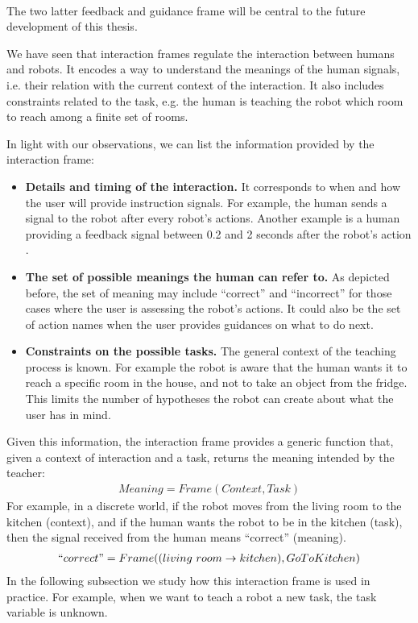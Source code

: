 \paragraph{} The two latter feedback and guidance frame will be central to the future development of this thesis. 

\transition

We have seen that interaction frames regulate the interaction between humans and robots. It encodes a way to understand the meanings of the human signals, i.e. their relation with the current context of the interaction. It also includes constraints related to the task, e.g. the human is teaching the robot which room to reach among a finite set of rooms.

In light with our observations, we can list the information provided by the interaction frame:

\begin{itemize}

\item \textbf{Details and timing of the interaction.} It corresponds to when and how the user will provide instruction signals. For example, the human sends a signal to the robot after every robot's actions. Another example is a human providing a feedback signal between 0.2 and 2 seconds after the robot's action \cite{knox2009interactively}.

\item \textbf{The set of possible meanings the human can refer to.} As depicted before, the set of meaning may include ``correct'' and ``incorrect'' for those cases where the user is assessing the robot's actions. It could also be the set of action names when the user provides guidances on what to do next.

\item \textbf{Constraints on the possible tasks.} The general context of the teaching process is known. For example the robot is aware that the human wants it to reach a specific room in the house, and not to take an object from the fridge. This limits the number of hypotheses the robot can create about what the user has in mind.

\end{itemize}

Given this information, the interaction frame provides a generic function that, given a context of interaction and a task, returns the meaning intended by the teacher:
%
\begin{eqnarray}
Meaning = Frame(Context, Task) \nonumber
\end{eqnarray}
%
For example, in a discrete world, if the robot moves from the living room to the kitchen (context), and if the human wants the robot to be in the kitchen (task), then the signal received from the human means ``correct'' (meaning). 
%
\begin{eqnarray}
``correct" = Frame((living~room \rightarrow kitchen), Go To Kitchen) \nonumber
\end{eqnarray}
%
In the following subsection we study how this interaction frame is used in practice. For example, when we want to teach a robot a new task, the task variable is unknown.

